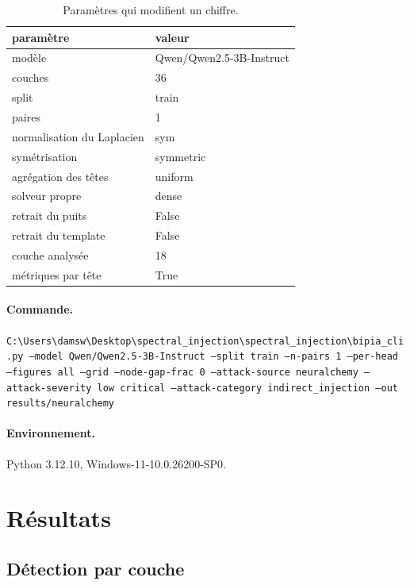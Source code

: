 \documentclass[11pt,a4paper]{article}
\begin{document}
\begin{table}[htbp]\centering\small
\begin{tabular}{ll}
\hline
paramètre & valeur \\
\hline
modèle & Qwen/Qwen2.5-3B-Instruct \\
couches & 36 \\
split & train \\
paires & 1 \\
normalisation du Laplacien & sym \\
symétrisation & symmetric \\
agrégation des têtes & uniform \\
solveur propre & dense \\
retrait du puits & False \\
retrait du template & False \\
couche analysée & 18 \\
métriques par tête & True \\
\hline
\end{tabular}
\caption{Paramètres qui modifient un chiffre.}
\label{tab:config}
\end{table}


\paragraph{Commande.}
\texttt{C:\textbackslash{}Users\textbackslash{}damsw\textbackslash{}Desktop\textbackslash{}spectral\_injection\textbackslash{}spectral\_injection\textbackslash{}bipia\_cli.py --model Qwen/Qwen2.5-3B-Instruct --split train --n-pairs 1 --per-head --figures all --grid --node-gap-frac 0 --attack-source neuralchemy --attack-severity low critical --attack-category indirect\_injection --out results/neuralchemy}

\paragraph{Environnement.}
Python 3.12.10, Windows-11-10.0.26200-SP0.


\section{Résultats}

\subsection{Détection par couche}
\end{document}

